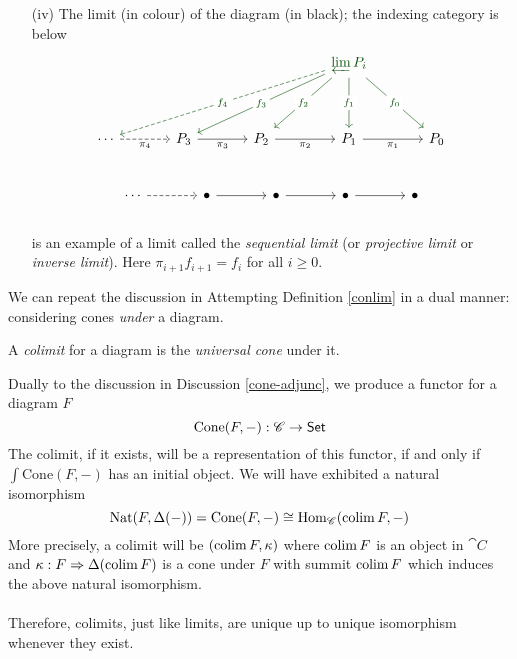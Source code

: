 \begin{example}
\begin{itemize}
\item[(iv)] The limit (in colour) of the diagram (in black); the indexing category is below  %
\[\begin{tikzcd}[row sep=huge, column sep=large]
                                   &                         &                         & {\color{darkgreen}\varprojlim P_i} \arrow[d, "f_1" description, darkgreen] \arrow[rd, "f_0" description, darkgreen] \arrow[ld, "f_2" description, darkgreen] \arrow[lld, "f_3" description, darkgreen] \arrow[llld, "f_4"' description, dashed, darkgreen] &     \\
\cdots \arrow[r, "\pi_4"', dashed] & P_3 \arrow[r, "\pi_3"'] & P_2 \arrow[r, "\pi_2"'] & P_1 \arrow[r, "\pi_1"']                                                                                              & P_0
\end{tikzcd}\]\\[-0.6em]
\[\begin{tikzcd}[row sep=huge, column sep=large]
\cdots \arrow[r, dashed] & \bullet \arrow[r] & \bullet \arrow[r] & \bullet \arrow[r] & \bullet
\end{tikzcd}\]\\[-0.6em]
is an example of a limit called the \emph{sequential limit} (or \emph{projective limit} or \emph{inverse limit}). Here $\pi_{i+1}f_{i+1} = f_i$ for all $i \geq 0$.
\end{itemize}
\end{example}

\vspace*{0.1in}

\begin{attempt-definition}
We can repeat the discussion in Attempting Definition \ref{conlim} in a dual manner: considering cones \emph{under} a diagram.

\vspace{0.1in}

\begin{definition}
A \emph{colimit} for a diagram is the \emph{universal cone} under it.
\end{definition}

\vspace*{0.1in}

Dually to the discussion in Discussion \ref{cone-adjunc}, we produce a functor for a diagram $F$
\[\mathrm{Cone}(F,-):\mathscr{C} \to \mathsf{Set}\]
The colimit, if it exists, will be a representation of this functor, if and only if $\int \mathrm{Cone}(F,-)$ has an initial object. We will have exhibited a natural isomorphism
\[\mathrm{Nat}(F,\Delta(-)) = \mathrm{Cone}(F,-) \cong \mathrm{Hom}_{\mathscr{C}}(\operatorname{colim} F,-)\]
More precisely, a colimit will be $(\operatorname{colim} F,\kappa)$ where $\operatorname{colim} F$ is an object in $\cat{C}$ and $\kappa: F \Rightarrow \Delta(\operatorname{colim} F)$ is a cone under $F$ with summit $\operatorname{colim} F$ which induces the above natural isomorphism.\\
\\
Therefore, colimits, just like limits, are unique up to unique isomorphism whenever they exist.
\end{attempt-definition}

